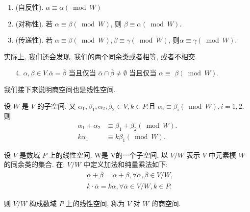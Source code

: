 \documentclass{ctexart}
\begin{document}
\begin{enumerate}

    \item (自反性). $\alpha \equiv \alpha(\bmod W)$
    \item (对称性). 若 $\alpha \equiv \beta(\bmod W)$, 则 $\beta \equiv \alpha(\bmod W)$.
    \item (传递性). 若 $\alpha \equiv \beta(\bmod W), \beta \equiv \gamma(\bmod W)$, 则$\alpha \equiv \gamma(\bmod W)$.
\end{enumerate}

实际上, 我们还会发现, 我们的两个同余类或者相等, 或者不相交.

\begin{itemize}
    \item [4.] $\alpha, \beta \in V . \bar{\alpha}=\bar{\beta}$ 当且仅当 $\bar{\alpha} \cap \bar{\beta} \neq \emptyset$ 当且仅当 $\alpha \equiv$ $\beta(\bmod W)$.
\end{itemize}

我们接下来说明商空间也是线性空间. 

\begin{theorem}
设 $W$ 是 $V$ 的子空间. 又 $\alpha_1, \beta_1, \alpha_2, \beta_2 \in V, k \in P$.且 $\alpha_i \equiv \beta_i(\bmod W), i=1,2$. 则
$$
\begin{aligned}
\alpha_1+\alpha_2 & \equiv \beta_1+\beta_2(\bmod W) . \\
k \alpha_1 & \equiv k \beta_1(\bmod W) .
\end{aligned}
$$
    
\end{theorem}

\begin{theorem}
 设 $V$ 是数域 $P$ 上的线性空间. W是 V的一个子空间. 以 $V / W$ 表示 $V$ 中元素模 $W$ 的同余类的集合. 在: $V / W$ 中定义加法和纯量乘法如下:
$$
\begin{aligned}
& \bar{\alpha}+\bar{\beta}=\overline{\alpha+\beta}, \forall \bar{\alpha}, \bar{\beta} \in V / W, \\
& k \cdot \bar{\alpha}=\overline{k \alpha}, \forall \bar{\alpha} \in V / W, k \in P .
\end{aligned}
$$

则 $V / W$ 构成数域 $P$ 上的线性空间, 称为 $V$ 对 $W$ 的商空间.
\end{theorem}
\end{document}
